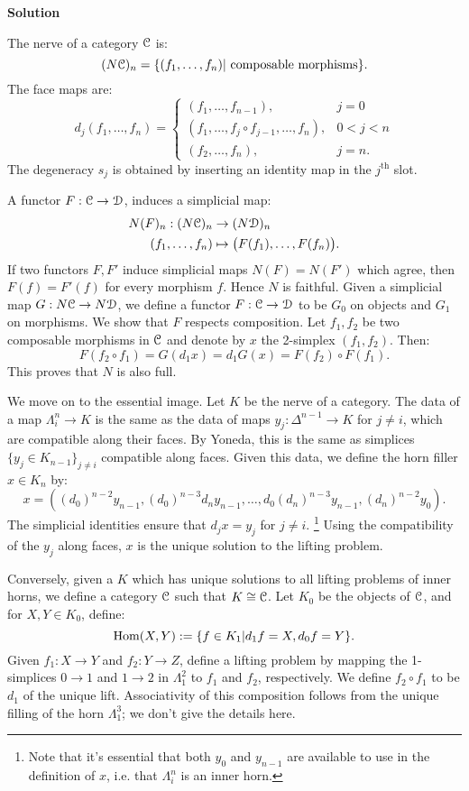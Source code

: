 \documentclass[10pt,a4paper,reqno,oneside]{book} %
\theoremstyle{plain}
\theoremstyle{definition}
\theoremstyle{remark}
\numberwithin{equation}{section}
\begin{document}
\noindent
\textbf{Solution}

\noindent
The nerve of a category $\mathcal C$ is:
\[	(N\mathcal C)_n = \{ (f_1, \dots, f_n) | \text{ composable morphisms} \}.	\]
The face maps are:
\[	d_j (f_1, \dots, f_n) = \left\{ \begin{array} {ll}
(f_1, \dots, f_{n-1}), & j=0 \\
(f_1, \dots, f_j \circ f_{j-1}, \dots, f_n), & 0<j<n \\
(f_2, \dots, f_n), & j=n.
\end{array} \right.	\]
The degeneracy $s_j$ is obtained by inserting an identity map in the $j^{\text{th}}$ slot.

A functor $F : \mathcal C \to \mathcal D$, induces a simplicial map:
\begin{align*}
N(F)_n : (N\mathcal C)_n &\to (N\mathcal D)_n \\
(f_1, \dots, f_n) &\mapsto \big(F(f_1), \dots, F(f_n)\big).
\end{align*}
If two functors $F, F'$ induce simplicial maps $N(F) = N(F')$ which agree, then $F(f) = F'(f)$ for every morphism $f$. Hence
$N$ is faithful. Given a simplicial map $G : N\mathcal C \to N\mathcal D$, we define a functor $F : \mathcal C \to \mathcal D$ to be $G_0$ on objects
and $G_1$ on morphisms. We show that $F$ respects composition. Let $f_1, f_2$ be two composable morphisms in $\mathcal C$ and denote by $x$
the 2-simplex $(f_1, f_2)$. Then:
\[	F(f_2 \circ f_1) = G(d_1 x) = d_1 G(x) = F(f_2) \circ F(f_1).	\]
This proves that $N$ is also full.

We move on to the essential image. Let $K$ be the nerve of a category. The data of a map $\Lambda^n_i \to K$ is the same
as the data of maps $y_j : \Delta^{n-1} \to K$ for $j\neq i$, which are compatible along their faces. By Yoneda, this is the
same as simplices $\{y_j \in K_{n-1} \}_{j\neq i}$ compatible along faces. Given this data, we define the horn filler
$x \in K_n$ by:
\[	x = \left( (d_0)^{n-2}y_{n-1}, (d_0)^{n-3}d_n y_{n-1}, \dots, d_0(d_n)^{n-3}y_{n-1}, (d_n)^{n-2} y_0 \right).	\]
The simplicial identities ensure that $d_j x = y_j$ for $j \neq i$. \footnote{Note that it's essential that both $y_0$ and $y_{n-1}$
are available to use in the definition of $x$, i.e. that $\Lambda^n_i$ is an inner horn.} Using the compatibility
of the $y_j$ along faces, $x$ is the unique solution to the lifting problem.

Conversely, given a $K$ which has unique solutions to all lifting problems of inner horns, we define a category $\mathcal C$ such
that $K \cong \mathcal C$. Let $K_0$ be the objects of $\mathcal C$, and for $X,Y \in K_0$, define:
\[	\operatorname{Hom}(X,Y) := \{f \in K_1 | d_1f = X, d_0f = Y \}.	\]
Given $f_1 : X \to Y$ and $f_2 : Y \to Z$, define a lifting problem by mapping the 1-simplices $0 \to 1$ and $1\to 2$ in
$\Lambda^2_1$ to $f_1$ and $f_2$, respectively. We define $f_2 \circ f_1$ to be $d_1$ of the unique lift. Associativity
of this composition follows from the unique filling of the horn $\Lambda^3_1$; we don't give the details here.
\end{document}
